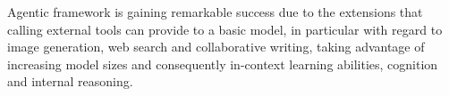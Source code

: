 Agentic framework is gaining remarkable success due to the extensions that calling external tools can provide to a basic model, in particular with regard to image generation, web search and collaborative writing, taking advantage of increasing model sizes and consequently in-context learning abilities, cognition and internal reasoning.